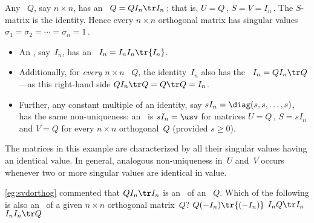 \begin{example} \label{eg:svdorthog}
Any ~\(Q\), say \(n\times n\), has an \svd\ \(Q=QI_n\tr I_n\)\,; that is, \(U=Q\)\,, \(S=V=I_n\)\,.
The \(S\)-matrix is the identity.
Hence every \(n\times n\) orthogonal matrix has singular values \(\sigma_1=\sigma_2=\cdots=\sigma_n=1\)\,.
\end{example}


\begin{example} \label{eg:svdnonuniq}
\begin{itemize}
\item An , say~\(I_n\), has an \svd\ \(I_n=I_nI_n\tr{I_n}\).  
\item Additionally, for \emph{every} \(n\times n\) ~\(Q\), the identity~\(I_n\) also has the \svd\ \(I_n=QI_n\tr Q\)---as this right-hand side \(QI_n\tr Q=Q\tr Q=I_n\).
\item Further, any constant multiple of an identity, say \(sI_n=\diag(s,s,\ldots,s)\), has the same non-uniqueness: an \svd\ is \(sI_n=\usv\) for matrices \(U=Q\)\,, \(S=sI_n\) and \(V=Q\) for every \(n\times n\) orthogonal~\(Q\) (provided \(s\geq0\)).
\end{itemize}
The matrices in this example are characterized by all their singular values having an identical value. 
In general, analogous non-uniqueness in~\(U\) and~\(V\) occurs whenever two or more singular values are identical in value.
\end{example}




\begin{activity}
\cref{eg:svdorthog} commented that \(QI_n\tr I_n\) is an \svd\ of an ~\(Q\).  
Which of the following is also an \svd\ of a given \(n\times n\) orthogonal matrix~\(Q\)?
{\(Q(-I_n)\tr{(-I_n)}\)}
{\(I_nQ\tr I_n\)}
{\(I_nI_n\tr Q\)}
\end{activity}





